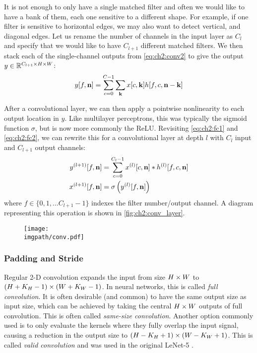 It is not enough to only have a single matched filter and often we would like to
have a bank of them, each one sensitive to a different shape. For example, if
one filter is sensitive to horizontal edges, we may also want to detect vertical, and
diagonal edges. Let us rename the number of channels in the input layer as
$C_{l}$ and specify that we would like to have $C_{l+1}$ different matched
filters. We then stack each of the single-channel outputs from
\eqref{eq:ch2:conv2} to give the output $y \in \reals[C_{l+1} \x H\x W]$:
%
\begin{equation}
  y[f, \nn] = \sum_{c=0}^{C-1} \sum_{\kk} x[c, \kk]h[f, c, \nn-\kk]
  \label{eq:ch2:conv3}
\end{equation}

After a convolutional layer, we can then apply a pointwise nonlinearity to
each output location in $y$. Like multilayer perceptrons, this was typically the
sigmoid function $\sigma$, but is now more commonly the ReLU\@. Revisiting
\eqref{eq:ch2:fc1} and
\eqref{eq:ch2:fc2}, we can rewrite this for a convolutional layer at depth $l$
with $C_l$ input and $C_{l+1}$ output channels:
\begin{align}
  y^{(l+1)}[f, \nn] &= \sum_{c=0}^{C_l-1} x^{(l)}[c, \nn] \conv h^{(l)}[f, c, \nn]
    \label{eq:ch2:conv4}\\
    x^{(l+1)}[f, \nn] &= \sigma\left(y^{(l)}[f, \nn]\right) \label{eq:ch2:conv4a}
\end{align}
where $f \in \{0, 1,\ldots C_{l+1}-1\}$ indexes the filter number/output channel. A diagram
representing this operation is shown in \autoref{fig:ch2:conv_layer}.

\begin{figure}
  \centering
  \texttt{[image: \\imgpath/conv.pdf]}
  \label{fig:ch2:conv_layer}
\end{figure}

\subsubsection{Padding and Stride}\label{sec:ch2:padding}
Regular 2-D convolution expands the input from size $H\x W$ to $(H+K_H-1)\x
(W+K_W-1)$. In neural networks, this is called \emph{full convolution}.
It is often desirable (and common) to
have the same output size as input size, which can be achieved by
taking the central $H\x W$ outputs of full convolution. This is often
called \emph{same-size convolution}.
Another option commonly used is to only evaluate the kernels where they fully
overlap the input signal, causing a reduction in the output size to $(H-K_H+1)
\x (W-K_W+1)$. This is called \emph{valid convolution} and was used in the
original LeNet-5 \cite{lecun_gradient-based_1998}.

